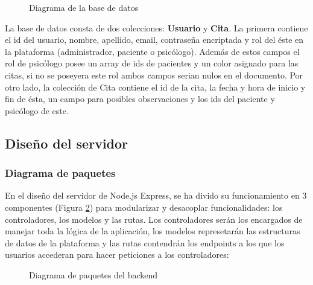 \begin{figure}[H]
    \caption{Diagrama de la base de datos}
    \label{bd}
\end{figure}

La base de datos consta de dos colecciones: \textbf{Usuario} y \textbf{Cita}. La primera contiene el id del usuario, nombre, apellido, email, contraseña encriptada y rol del éste en la plataforma (administrador, paciente o psicólogo). Además de estos campos el rol de psicólogo posee un array de ids de pacientes y un color asignado para las citas, si no se poseyera este rol ambos campos serian nulos en el documento. Por otro lado, la colección de Cita contiene el id de la cita, la fecha y hora de inicio y fin de ésta, un campo para posibles observaciones y los ids del paciente y psicólogo de este.

\subsection{Diseño del servidor}

\subsubsection*{Diagrama de paquetes }
En el diseño del servidor de Node.js Express, se ha divido su funcionamiento en 3 componentes (Figura \ref{fig:paquetes-back}) para modularizar y desacoplar funcionalidades: los controladores, los modelos y las rutas. Los controladores serán los encargados de manejar toda la lógica de la aplicación, los modelos represetarán las estructuras de datos de la plataforma y las rutas contendrán los endpoints a los que los usuarios accederan para hacer peticiones a los controladores:

\begin{figure}[H]
    \caption{Diagrama de paquetes del backend}
    \label{fig:paquetes-back}
\end{figure}

